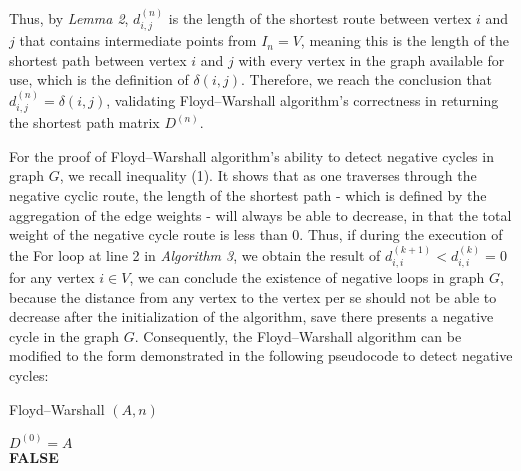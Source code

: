 \documentclass[12pt]{article}
\begin{document}
\hspace*{\fill} %

Thus, by \textit{Lemma 2}, $d^{(n)}_{i,j}$ is the length of the shortest route between vertex $i$ and $j$ that contains intermediate points from $I_n = V$, meaning this is the length of the shortest path between vertex $i$ and $j$ with every vertex in the graph available for use, which is the definition of $\delta(i, j)$. Therefore, we reach the conclusion that $d^{(n)}_{i,j} = \delta(i, j)$, validating Floyd–Warshall algorithm's correctness in returning the shortest path matrix $D^{(n)}$.

\hspace*{\fill} %

For the proof of Floyd–Warshall algorithm's ability to detect negative cycles in graph $G$, we recall inequality (1). It shows that as one traverses through the negative cyclic route, the length of the shortest path - which is defined by the aggregation of the edge weights - will always be able to decrease, in that the total weight of the negative cycle route is less than 0. Thus, if during the execution of the For loop at line 2 in \textit{Algorithm 3}, we obtain the result of $d^{(k+1)}_{i, i} < d^{(k)}_{i, i} = 0$ for any vertex $i \in V$, we can conclude the existence of negative loops in graph $G$, because the distance from any vertex to the vertex per se should not be able to decrease after the initialization of the algorithm, save there presents a negative cycle in the graph $G$. Consequently, the Floyd–Warshall algorithm can be modified to the form demonstrated in the following pseudocode to detect negative cycles:

\begin{algorithm}[H]
    \SetAlgoLined
    \caption{Floyd–Warshall $(A, n)$}
    $D^{(0)} = A$\\
    \Return \textbf{FALSE}\
    \end{algorithm}
\end{document}
